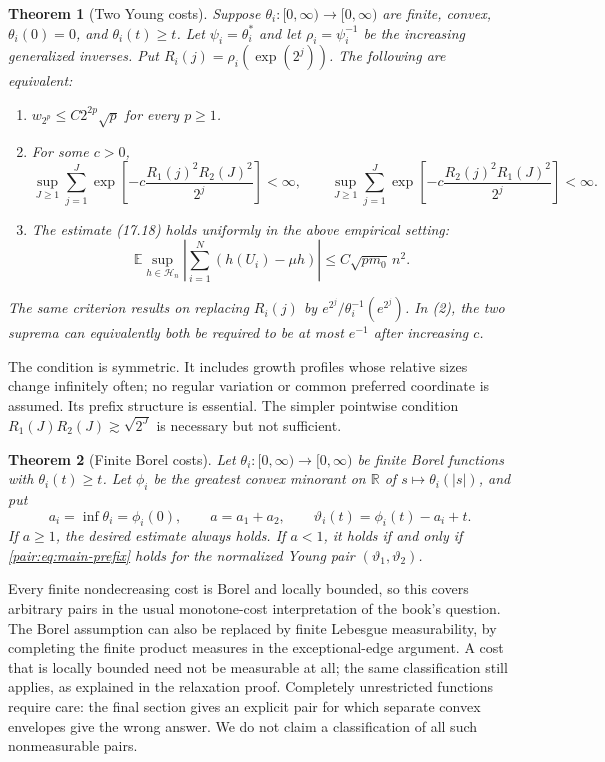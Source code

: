 \documentclass[11pt]{article}
\newtheorem{theorem}{Theorem}[section]
\newcommand{\E}{\mathbb E}
\newcommand{\R}{\mathbb R}
\numberwithin{equation}{section}
\begin{document}
\begin{theorem}[Two Young costs]\label{pair:thm:criterion}
Suppose $\theta_i:[0,\infty)\to[0,\infty)$ are finite, convex,
$\theta_i(0)=0$, and $\theta_i(t)\ge t$. Let $\psi_i=\theta_i^*$
and let $\rho_i=\psi_i^{-1}$ be the increasing generalized inverses.
Put $R_i(j)=\rho_i(\exp(2^j))$. The following are equivalent:
\begin{enumerate}
\item $w_{2^p}\le C2^{2p}\sqrt p$ for every $p\ge1$.
\item For some $c>0$,
\begin{equation}\label{pair:eq:main-prefix}
 \sup_{J\ge1}\sum_{j=1}^J
 \exp\left[-c\frac{R_1(j)^2R_2(J)^2}{2^j}\right]<\infty,
 \qquad
 \sup_{J\ge1}\sum_{j=1}^J
 \exp\left[-c\frac{R_2(j)^2R_1(J)^2}{2^j}\right]<\infty.
\end{equation}
\item The estimate (17.18) holds uniformly in the above empirical setting:
\[
 \E\sup_{h\in\mathcal H_n}
 \left|\sum_{i=1}^N(h(U_i)-\mu h)\right|
 \le C\sqrt{pm_0}\,n^2.
\]
\end{enumerate}
The same criterion results on replacing $R_i(j)$ by
$e^{2^j}/\theta_i^{-1}(e^{2^j})$. In (2), the two suprema can
equivalently both be required to be at most $e^{-1}$ after increasing $c$.
\end{theorem}

The condition is symmetric. It includes growth profiles whose relative
sizes change infinitely often; no regular variation or common preferred
coordinate is assumed. Its prefix structure is essential. The simpler
pointwise condition $R_1(J)R_2(J)\gtrsim\sqrt{2^J}$ is necessary but
not sufficient.

\begin{theorem}[Finite Borel costs]\label{pair:thm:borel}
Let $\theta_i:[0,\infty)\to[0,\infty)$ be finite Borel functions with
$\theta_i(t)\ge t$. Let $\phi_i$ be the greatest convex minorant on
$\R$ of $s\mapsto\theta_i(|s|)$, and put
\[
 a_i=\inf\theta_i=\phi_i(0),\qquad a=a_1+a_2,
 \qquad \vartheta_i(t)=\phi_i(t)-a_i+t.
\]
If $a\ge1$, the desired estimate always holds. If $a<1$, it holds if
and only if \eqref{pair:eq:main-prefix} holds for the normalized Young
pair $(\vartheta_1,\vartheta_2)$.
\end{theorem}

Every finite nondecreasing cost is Borel and locally bounded, so this
covers arbitrary pairs in the usual monotone-cost interpretation of the
book's question. The Borel assumption can also be replaced by finite
Lebesgue measurability, by completing the finite product measures in the
exceptional-edge argument. A cost that is locally bounded need not be
measurable at all; the same classification still applies, as explained
in the relaxation proof. Completely unrestricted functions require
care: the final section gives an explicit pair for which separate convex
envelopes give the wrong answer. We do not claim a classification of
all such nonmeasurable pairs.
\end{document}
